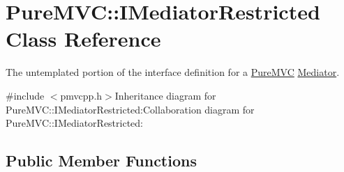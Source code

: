 \hypertarget{class_pure_m_v_c_1_1_i_mediator_restricted}{
\section{PureMVC::IMediatorRestricted Class Reference}
\label{class_pure_m_v_c_1_1_i_mediator_restricted}
}


The untemplated portion of the interface definition for a \hyperlink{namespace_pure_m_v_c}{PureMVC} \hyperlink{class_pure_m_v_c_1_1_mediator}{Mediator}.  


{\ttfamily \#include $<$pmvcpp.h$>$}Inheritance diagram for PureMVC::IMediatorRestricted:Collaboration diagram for PureMVC::IMediatorRestricted:\subsection*{Public Member Functions}
